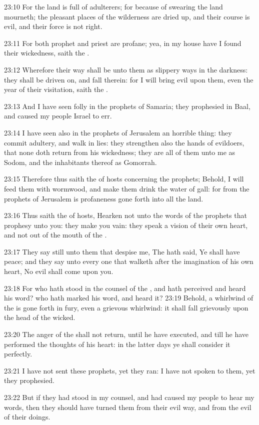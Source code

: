 23:10 For the land is full of adulterers; for because of swearing the land mourneth; the pleasant places of the wilderness are dried up, and their course is evil, and their force is not right.

23:11 For both prophet and priest are profane; yea, in my house have I found their wickedness, saith the \LORD.

23:12 Wherefore their way shall be unto them as slippery ways in the darkness: they shall be driven on, and fall therein: for I will bring evil upon them, even the year of their visitation, saith the \LORD.

23:13 And I have seen folly in the prophets of Samaria; they prophesied in Baal, and caused my people Israel to err.

23:14 I have seen also in the prophets of Jerusalem an horrible thing: they commit adultery, and walk in lies: they strengthen also the hands of evildoers, that none doth return from his wickedness; they are all of them unto me as Sodom, and the inhabitants thereof as Gomorrah.

23:15 Therefore thus saith the \LORD of hosts concerning the prophets; Behold, I will feed them with wormwood, and make them drink the water of gall: for from the prophets of Jerusalem is profaneness gone forth into all the land.

23:16 Thus saith the \LORD of hosts, Hearken not unto the words of the prophets that prophesy unto you: they make you vain: they speak a vision of their own heart, and not out of the mouth of the \LORD.

23:17 They say still unto them that despise me, The \LORD hath said, Ye shall have peace; and they say unto every one that walketh after the imagination of his own heart, No evil shall come upon you.

23:18 For who hath stood in the counsel of the \LORD, and hath perceived and heard his word? who hath marked his word, and heard it?  23:19 Behold, a whirlwind of the \LORD is gone forth in fury, even a grievous whirlwind: it shall fall grievously upon the head of the wicked.

23:20 The anger of the \LORD shall not return, until he have executed, and till he have performed the thoughts of his heart: in the latter days ye shall consider it perfectly.

23:21 I have not sent these prophets, yet they ran: I have not spoken to them, yet they prophesied.

23:22 But if they had stood in my counsel, and had caused my people to hear my words, then they should have turned them from their evil way, and from the evil of their doings.

